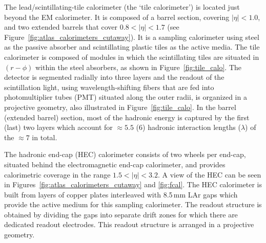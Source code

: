 The lead/scintillating-tile calorimeter (the `tile calorimeter') is located just beyond
the EM calorimeter.
It is composed of a barrel section, covering $\lvert \eta \rvert < 1.0$,
and two extended barrels that cover $0.8 < \lvert \eta \rvert < 1.7$ (see Figure~\ref{fig:atlas_calorimeters_cutaway}).
It is a sampling calorimeter using steel as the passive absorber and scintillating
plastic tiles as the active media.
The tile calorimeter is composed of modules in which the scintillating
tiles are situated in $(r-\phi)$ within the steel absorbers, as shown in Figure~\ref{fig:tile_calo}.
The detector is segmented radially into three layers and the readout of the
scintillation light, using wavelength-shifting fibers that are fed into photomultiplier tubes (PMT)
situated along the outer radii, is organized in a projective
geometry, also illustrated in Figure~\ref{fig:tile_calo}.
In the barrel (extended barrel) section, most of the hadronic energy is captured by the first (last) two
layers which account for $\approx 5.5$ ($6$) hadronic interaction lengths ($\lambda$)
of the $\approx 7$ in total.

The hadronic end-cap (HEC) calorimeter consists of two wheels per end-cap, situated
behind the electromagnetic end-cap calorimeter, and
provides calorimetric coverage in the range $1.5 < \lvert \eta \rvert <3.2$.
A view of the HEC can be seen in Figures~\ref{fig:atlas_calorimeters_cutaway} and \ref{fig:fcal}.
The HEC calorimeter is built from layers of copper plates interleaved with 8.5\,mm LAr gaps
which provide the active medium for this sampling calorimeter.
The readout structure is obtained by dividing the gaps into separate drift zones for
which there are dedicated readout electrodes.
This readout structure is arranged in a projective geometry.

